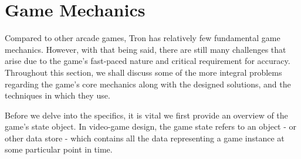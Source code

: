 \documentclass{standalone}
\begin{document}
	\section{Game Mechanics}
		Compared to other arcade games, Tron has relatively few fundamental game mechanics. However, with that being said, there are still many challenges that arise due to the game's fast-paced nature and critical requirement for accuracy. Throughout this section, we shall discuss some of the more integral problems regarding the game's core mechanics along with the designed solutions, and the techniques in which they use.

		Before we delve into the specifics, it is vital we first provide an overview of the game's state object. In video-game design, the game state refers to an object - or other data store - which contains all the data representing a game instance at some particular point in time.
\end{document}
